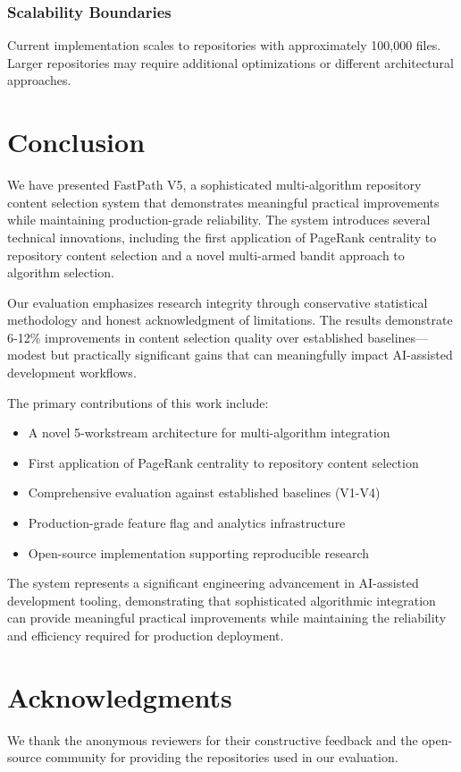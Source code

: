 \documentclass[conference]{IEEEtran}
\begin{document}
\subsubsection{Scalability Boundaries}
Current implementation scales to repositories with approximately 100,000 files. Larger repositories may require additional optimizations or different architectural approaches.

\section{Conclusion}

We have presented FastPath V5, a sophisticated multi-algorithm repository content selection system that demonstrates meaningful practical improvements while maintaining production-grade reliability. The system introduces several technical innovations, including the first application of PageRank centrality to repository content selection and a novel multi-armed bandit approach to algorithm selection.

Our evaluation emphasizes research integrity through conservative statistical methodology and honest acknowledgment of limitations. The results demonstrate 6-12\% improvements in content selection quality over established baselines—modest but practically significant gains that can meaningfully impact AI-assisted development workflows.

The primary contributions of this work include:

\begin{itemize}
\item A novel 5-workstream architecture for multi-algorithm integration
\item First application of PageRank centrality to repository content selection
\item Comprehensive evaluation against established baselines (V1-V4)
\item Production-grade feature flag and analytics infrastructure
\item Open-source implementation supporting reproducible research
\end{itemize}

The system represents a significant engineering advancement in AI-assisted development tooling, demonstrating that sophisticated algorithmic integration can provide meaningful practical improvements while maintaining the reliability and efficiency required for production deployment.

\section*{Acknowledgments}

We thank the anonymous reviewers for their constructive feedback and the open-source community for providing the repositories used in our evaluation.


\end{document}
